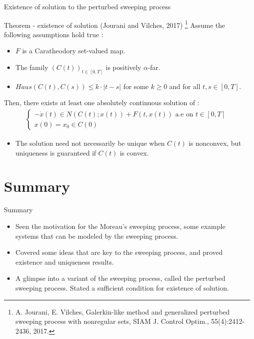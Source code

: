 \documentclass[8pt,aspectratio=169]{beamer}
\begin{document}
\begin{frame}[fragile]{Existence of solution to the perturbed sweeping process}
    \begin{block}{Theorem - existence of solution (Jourani and Vilches, 2017)} \footnote{A. Jourani, E. Vilches, Galerkin-like method and generalized perturbed sweeping process with nonregular sets, SIAM J. Control Optim., 55(4):2412-2436, 2017.}
        Assume the following assumptions hold true :
        \begin{itemize}
            \item $F$ is a Caratheodory set-valued map.
            \item The family $(C(t))_{t\in[0, T]}$ is positively $\alpha$-far.
            \item $Haus(C(t), C(s)) \leq k\cdot |t-s|$ for some $k\geq 0$ and for all $t, s \in [0, T]$.
        \end{itemize}
        Then, there exists at least one absolutely continuous solution of : 
        \begin{align*}
            \begin{cases}
                -\dot{x}(t) \in N(C(t); x(t)) + F(t, x(t)) \text{ a.e on } t\in [0, T]\\
                x(0) = x_0 \in C(0)
            \end{cases}
        \end{align*}
        \begin{itemize}
            \item The solution need not necessarily be unique when $C(t)$ is nonconvex, but uniqueness is guaranteed if $C(t)$ is convex.
        \end{itemize}
    \end{block}
\end{frame}


\section{Summary}

\begin{frame}{Summary}
	\begin{itemize}
		\item Seen the motivation for the Moreau's sweeping process, some example systems that can be modeled by the sweeping process.
        \item Covered some ideas that are key to the sweeping process, and proved existence and uniqueness results.
        \item A glimpse into a variant of the sweeping process, called the perturbed sweeping process. Stated a sufficient condition for existence of solution.
	\end{itemize}
\end{frame}
\end{document}
